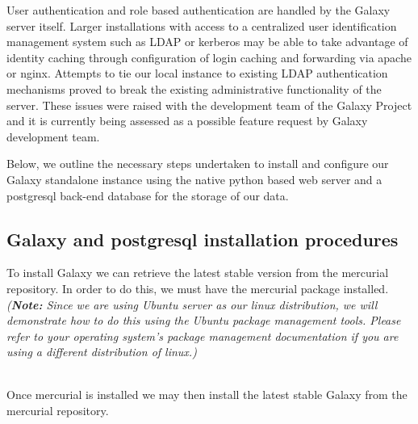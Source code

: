 \documentclass[a4paper,10pt]{article}
\begin{document}
User authentication and role based authentication are handled by the Galaxy server itself.  Larger installations with access to a centralized user identification management system such as LDAP or kerberos may be able to take advantage of identity caching through configuration of login caching and forwarding via apache or nginx.  Attempts to tie our local instance to existing LDAP authentication mechanisms proved to break the existing administrative functionality of the server.  These issues were raised with the development team of the Galaxy Project and it is currently being assessed as a possible feature request by Galaxy development team.

Below, we outline the necessary steps undertaken to install and configure our Galaxy standalone instance using the native python based web server and a postgresql back-end database for the storage of our data.
\subsection{Galaxy and postgresql installation procedures}
To install Galaxy we can retrieve the latest stable version from the mercurial repository.  In order to do this, we must have the mercurial package installed.  \textit{(\textbf{Note:} Since we are using Ubuntu server as our linux distribution, we will demonstrate how to do this using the Ubuntu package management tools.  Please refer to your operating system's package management documentation if you are using a different distribution of linux.)}
\\\\

\vspace{1em}
Once mercurial is installed we may then install the latest stable Galaxy from the mercurial repository.
\\\\
\end{document}

